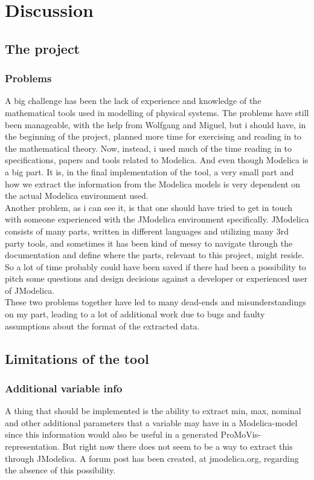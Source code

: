 \section{Discussion}
\subsection{The project}
\subsubsection{Problems}
A big challenge has been the lack of experience and knowledge of the mathematical tools used in modelling of physical systems. The problems have still been manageable, with the help from Wolfgang and Miguel, but i should have, in the beginning of the project, planned more time for exercising and reading in to the mathematical theory. Now, instead, i used much of the time reading in to specifications, papers and tools related to Modelica. And even though Modelica is a big part. It is, in the final implementation of the tool, a very small part and how we extract the information from the Modelica models is very dependent on the actual Modelica environment used.\\\newline Another problem, as i can see it, is that one should have tried to get in touch with someone experienced with the JModelica environment specifically. JModelica consists of many parts, written in different languages and utilizing many 3rd party tools, and sometimes it has been kind of messy to navigate through the documentation and define where the parts, relevant to this project, might reside. So a lot of time probably could have been saved if there had been a possibility to pitch some questions and design decisions against a developer or experienced user of JModelica.\\\newline These two problems together have led to many dead-ends and misunderstandings on my part, leading to a lot of additional work due to bugs and faulty assumptions about the format of the extracted data.
\subsection{Limitations of the tool}
\subsubsection{Additional variable info}
A thing that should be implemented is the ability to extract min, max, nominal and other additional parameters that a variable may have in a Modelica-model since this information would also be useful in a generated ProMoVis-representation. But right now there does not seem to be a way to extract this through JModelica. A forum post has been created, at jmodelica.org, regarding the absence of this possibility.
